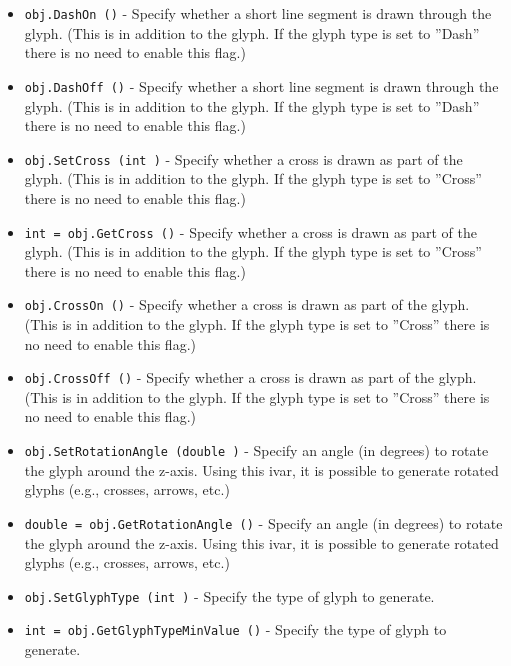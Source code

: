 \begin{itemize}
\item  \verb|obj.DashOn ()| -  Specify whether a short line segment is drawn through the
 glyph. (This is in addition to the glyph. If the glyph type
 is set to ''Dash'' there is no need to enable this flag.)

\item  \verb|obj.DashOff ()| -  Specify whether a short line segment is drawn through the
 glyph. (This is in addition to the glyph. If the glyph type
 is set to ''Dash'' there is no need to enable this flag.)

\item  \verb|obj.SetCross (int )| -  Specify whether a cross is drawn as part of the glyph. (This 
 is in addition to the glyph. If the glyph type is set to 
 ''Cross'' there is no need to enable this flag.)

\item  \verb|int = obj.GetCross ()| -  Specify whether a cross is drawn as part of the glyph. (This 
 is in addition to the glyph. If the glyph type is set to 
 ''Cross'' there is no need to enable this flag.)

\item  \verb|obj.CrossOn ()| -  Specify whether a cross is drawn as part of the glyph. (This 
 is in addition to the glyph. If the glyph type is set to 
 ''Cross'' there is no need to enable this flag.)

\item  \verb|obj.CrossOff ()| -  Specify whether a cross is drawn as part of the glyph. (This 
 is in addition to the glyph. If the glyph type is set to 
 ''Cross'' there is no need to enable this flag.)

\item  \verb|obj.SetRotationAngle (double )| -  Specify an angle (in degrees) to rotate the glyph around
 the z-axis. Using this ivar, it is possible to generate
 rotated glyphs (e.g., crosses, arrows, etc.)

\item  \verb|double = obj.GetRotationAngle ()| -  Specify an angle (in degrees) to rotate the glyph around
 the z-axis. Using this ivar, it is possible to generate
 rotated glyphs (e.g., crosses, arrows, etc.)

\item  \verb|obj.SetGlyphType (int )| -  Specify the type of glyph to generate.

\item  \verb|int = obj.GetGlyphTypeMinValue ()| -  Specify the type of glyph to generate.


\end{itemize}
